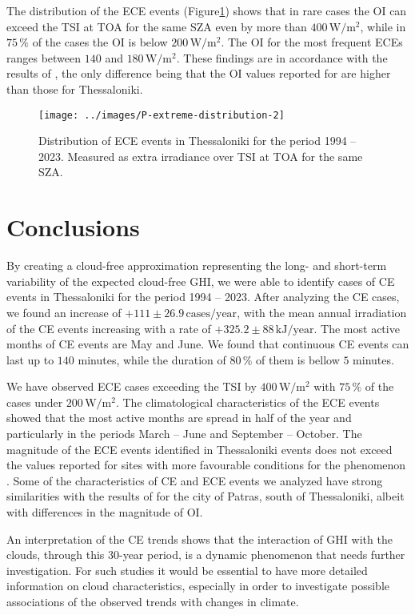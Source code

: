 \documentclass[preprint, 5p,
authoryear]{elsarticle} %
\begin{document}
The distribution of the ECE events
(Figure\nobreakspace{}\ref{fig:P-extreme-distribution}) shows that in
rare cases the OI can exceed the TSI at TOA for the same SZA even by
more than \(400\,\text{W}/\text{m}^2\), while in \(75\,\%\) of the cases
the OI is below \(200\,\text{W}/\text{m}^2\). The OI for the most
frequent ECEs ranges between \(140\) and \(180\,\text{W}/\text{m}^2\).
These findings are in accordance with the results of
\citet{Vamvakas2020}, the only difference being that the OI values
reported for are higher than those for Thessaloniki.

\begin{figure}

{\centering \texttt{[image: ../images/P-extreme-distribution-2]} 

}

\caption{Distribution of ECE events in Thessaloniki for the period 1994 -- 2023. Measured as extra irradiance over TSI at TOA for the same SZA.}\label{fig:P-extreme-distribution}
\end{figure}

\hypertarget{conclusions}{%
\section{Conclusions}\label{conclusions}}

By creating a cloud-free approximation representing the long- and
short-term variability of the expected cloud-free GHI, we were able to
identify cases of CE events in Thessaloniki for the period 1994 -- 2023.
After analyzing the CE cases, we found an increase of
\(+111\pm 26.9\,\text{cases}/\text{year}\), with the mean annual
irradiation of the CE events increasing with a rate of
\(+325.2\pm 88\,\text{kJ}/\text{year}\). The most active months of CE
events are May and June. We found that continuous CE events can last up
to \(140\) minutes, while the duration of \(80\,\%\) of them is bellow
\(5\) minutes.

We have observed ECE cases exceeding the TSI by
\(400\,\text{W}/\text{m}^{2}\) with \(75\,\%\) of the cases under
\(200\,\text{W}/\text{m}^{2}\). The climatological characteristics of
the ECE events showed that the most active months are spread in half of
the year and particularly in the periods March -- June and September --
October. The magnitude of the ECE events identified in Thessaloniki
events does not exceed the values reported for sites with more
favourable conditions for the phenomenon \citep[e.g.,][]{Cordero2023}.
Some of the characteristics of CE and ECE events we analyzed have strong
similarities with the results of \citet{Vamvakas2020} for the city of
Patras, south of Thessaloniki, albeit with differences in the magnitude
of OI.

An interpretation of the CE trends shows that the interaction of GHI
with the clouds, through this 30-year period, is a dynamic phenomenon
that needs further investigation. For such studies it would be essential
to have more detailed information on cloud characteristics, especially
in order to investigate possible associations of the observed trends
with changes in climate.


\end{document}
